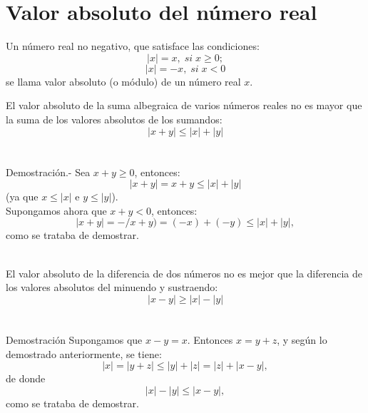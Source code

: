 \section{Valor absoluto del número real}

    \begin{tcolorbox}[colframe=white]
	\begin{def.}
	    Un número real no negativo, que satisface las condiciones: $$|x|=x, \; si \; x\geq 0;$$ $$|x| = -x, \; si \; x<0$$ se llama valor absoluto (o módulo) de un número real $x$.\\ 
	\end{def.}
    \end{tcolorbox}


    \begin{tcolorbox}[colframe=white]
	\begin{prop}	
	    El valor absoluto de la suma albegraica de varios números reales no es mayor que la suma de los valores absolutos de los sumandos:
	    $$|x+y| \leq |x| +|y|$$\\\\
	    Demostración.-\; Sea $x+y\geq 0$, entonces:
	    $$|x+y| = x+y \leq |x| + |y| $$ (ya que $x\leq |x|$ e $y\leq |y|$). \\
	    Supongamos ahora que $x+y<0$, entonces:
	    $$|x+y| = -/x+y) = (-x) + (-y) \leq |x| + |y|,$$ como se trataba de demostrar.\\\\
	\end{prop}
    \end{tcolorbox}

    \begin{tcolorbox}[colframe=white]
	\begin{prop}
	  El valor absoluto de la diferencia de dos números no es mejor que la diferencia de los valores absolutos del minuendo y sustraendo:
	  $$|x-y|\geq |x| - |y|$$\\\\
	  Demostración\; Supongamos que $x-y=x$. Entonces $x=y+z$, y según lo demostrado anteriormente, se tiene:
	  $$|x|=|y+z| \leq |y| + |z| = |z| + |x-y|,$$ de donde $$|x| - |y| \leq |x-y|,$$ como se trataba de demostrar.\\\\
	\end{prop}
    \end{tcolorbox}

